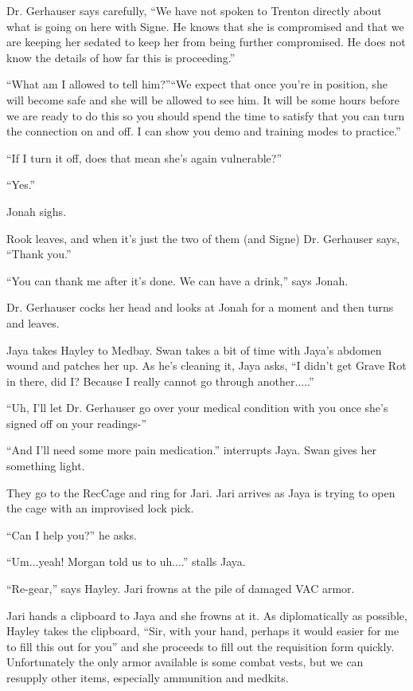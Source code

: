 Dr. Gerhauser says carefully, ``We have not spoken to Trenton directly about what is going on here with Signe.  He knows that she is compromised and that we are keeping her sedated to keep her from being further compromised.  He does not know the details of how far this is proceeding.''

``What am I allowed to tell him?''``We expect that once you're in position, she will become safe and she will be allowed to see him.  It will be some hours before we are ready to do this so you should spend the time to satisfy that you can turn the connection on and off.  I can show you demo and training modes to practice.''

``If I turn it off, does that mean she's again vulnerable?''

``Yes.''

Jonah sighs.

Rook leaves, and when it's just the two of them (and Signe) Dr. Gerhauser says, ``Thank you.''

``You can thank me after it's done.  We can have a drink,'' says Jonah.

Dr. Gerhauser cocks her head and looks at Jonah for a moment and then turns and leaves.





Jaya takes Hayley to Medbay.  Swan takes a bit of time with Jaya's abdomen wound and patches her up.  As he's cleaning it, Jaya asks, ``I didn't get Grave Rot in there, did I?  Because I really cannot go through another.....''

``Uh, I'll let Dr. Gerhauser go over your medical condition with you once she's signed off on your readings-''

``And I'll need some more pain medication.'' interrupts Jaya.  Swan gives her something light.



They go to the RecCage and ring for Jari.  Jari arrives as Jaya is trying to open the cage with an improvised lock pick.  

``Can I help you?'' he asks.

``Um...yeah!  Morgan told us to uh....'' stalls Jaya.

``Re-gear,'' says Hayley.  Jari frowns at the pile of damaged VAC armor.

Jari hands a clipboard to Jaya and she frowns at it.   As diplomatically as possible, Hayley takes the clipboard, ``Sir, with your hand, perhaps it would easier for me to fill this out for you'' and she proceeds to fill out the requisition form quickly.  Unfortunately the only armor available is some combat vests, but we can resupply other items, especially ammunition and medkits.

